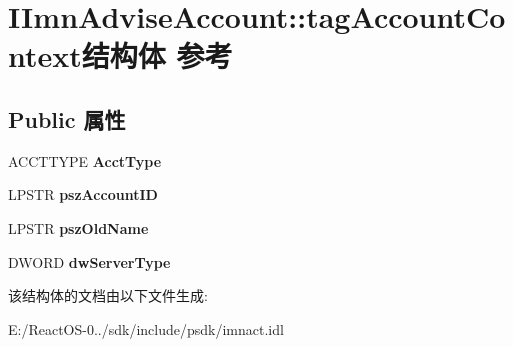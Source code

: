 \hypertarget{struct_i_imn_advise_account_1_1tag_account_context}{}\section{I\+Imn\+Advise\+Account\+:\+:tag\+Account\+Context结构体 参考}
\label{struct_i_imn_advise_account_1_1tag_account_context}
\subsection*{Public 属性}
\begin{DoxyCompactItemize}
\item 
\mbox{\label{struct_i_imn_advise_account_1_1tag_account_context_af46c545d17cf1c5f509aa2bc0f33c844}} 
A\+C\+C\+T\+T\+Y\+PE {\bfseries Acct\+Type}
\item 
\mbox{\label{struct_i_imn_advise_account_1_1tag_account_context_a0b4bad6b09fb21f78bc87dab63e2a778}} 
L\+P\+S\+TR {\bfseries psz\+Account\+ID}
\item 
\mbox{\label{struct_i_imn_advise_account_1_1tag_account_context_aae46e2acfbc3999d43bfdc57b25f44f6}} 
L\+P\+S\+TR {\bfseries psz\+Old\+Name}
\item 
\mbox{\label{struct_i_imn_advise_account_1_1tag_account_context_ae4541db161578d7aaa28c5a7eee1ca5e}} 
D\+W\+O\+RD {\bfseries dw\+Server\+Type}
\end{DoxyCompactItemize}


该结构体的文档由以下文件生成\+:\begin{DoxyCompactItemize}
\item 
E\+:/\+React\+O\+S-\/0../sdk/include/psdk/imnact.\+idl\end{DoxyCompactItemize}

